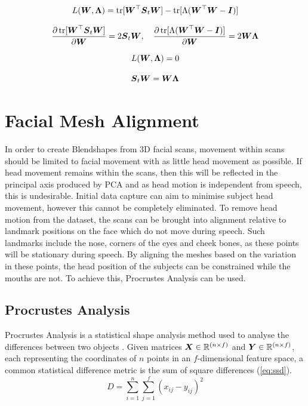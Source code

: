 \begin{equation*}
    L({\boldsymbol{{W}}}, {\boldsymbol{{\Lambda}}}) = \operatorname{tr}[{\boldsymbol{{W}}}^\top {\boldsymbol{{S}}}_t {\boldsymbol{{W}}}] - \operatorname{tr}[\Lambda({\boldsymbol{{W}}}^\top {\boldsymbol{{W}}} - {\boldsymbol{{I}}})]
\end{equation*}

\begin{equation*}
    \frac{\partial \operatorname{tr}[{\boldsymbol{{W}}}^\top {\boldsymbol{{S}}}_t {\boldsymbol{{W}}}]}{\partial {\boldsymbol{{W}}}} = 2 {\boldsymbol{{S}}}_t {\boldsymbol{{W}}},
    \quad
    \frac{\partial \operatorname{tr}[\Lambda({\boldsymbol{{W}}}^\top {\boldsymbol{{W}}} - {\boldsymbol{{I}}})]}{\partial {\boldsymbol{{W}}}} = 2 {\boldsymbol{{W \Lambda}}}
\end{equation*}

\begin{equation*}
    L({\boldsymbol{{W}}}, {\boldsymbol{{\Lambda}}}) = 0 
\end{equation*}

\begin{equation} \label{eq:pca_solved}
    {\boldsymbol{{S}}}_t {\boldsymbol{{W}}} = {\boldsymbol{{W \Lambda}}}
\end{equation}

\section{Facial Mesh Alignment}
In order to create Blendshapes from 3D facial scans, movement within scans should be limited to facial movement with as little head movement as possible.
If head movement remains within the scans, then this will be reflected in the principal axis produced by PCA and as head motion is independent from speech, this is undesirable.
Initial data capture can aim to minimise subject head movement, however this cannot be completely eliminated.
To remove head motion from the dataset, the scans can be brought into alignment relative to landmark positions on the face which do not move during speech.
Such landmarks include the nose, corners of the eyes and cheek bones, as these points will be stationary during speech.
By aligning the meshes based on the variation in these points, the head position of the subjects can be constrained while the mouths are not.
To achieve this, Procrustes Analysis can be used.

\subsection{Procrustes Analysis} \label{sec:procrustes_analysis}
Procrustes Analysis is a statistical shape analysis method used to analyse the differences between two objects \cite{Krzanowski2000}.
Given matrices ${\boldsymbol{{X}}} \in \mathbb{R}^{(n\times f)}$ and ${\boldsymbol{{Y}}} \in \mathbb{R}^{(n\times f)}$, each representing the coordinates of $n$ points in an $f$-dimensional feature space, a common statistical difference metric is the sum of square differences (\ref{eq:ssd}).
\begin{equation}
    \label{eq:ssd}
    D = \sum_{i=1}^{n} \sum_{j=1}^{f} (x_{ij} - y_{ij})^2
\end{equation}

